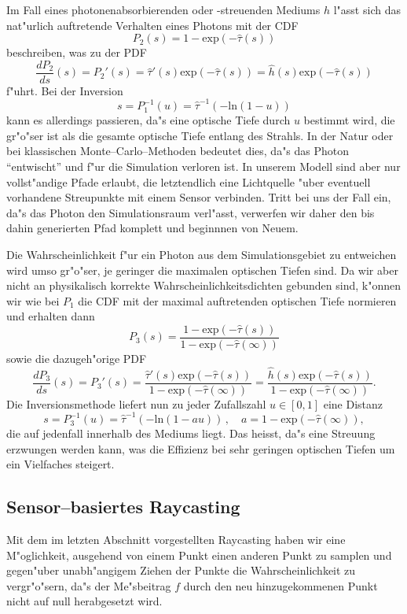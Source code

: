 	Im Fall eines photonenabsorbierenden oder -streuenden Mediums $h$ l"asst sich das nat"urlich auftretende Verhalten eines Photons mit der CDF
	$$P_2(s)=1-\text{exp}(-{\hat \tau}(s))$$
	beschreiben, was zu der PDF
	$$\frac{dP_2}{ds}(s)=P_2'(s)={\hat \tau}'(s)\text{exp}(-{\hat \tau}(s))={\hat h}(s)\text{exp}(-{\hat \tau}(s))$$
	f"uhrt. Bei der Inversion
	$$s=P_1^{-1}(u)={\hat \tau}^{-1}\left(-\text{ln}(1-u)\right)$$
	kann es allerdings passieren, da"s eine optische Tiefe durch $u$ bestimmt wird, die gr"o"ser ist als die gesamte optische Tiefe entlang des Strahls. In der Natur oder bei klassischen Monte--Carlo--Methoden bedeutet dies, da"s das Photon ``entwischt'' und f"ur die Simulation verloren ist. In unserem Modell sind aber nur vollst"andige Pfade erlaubt, die letztendlich eine Lichtquelle "uber eventuell vorhandene Streupunkte mit einem Sensor verbinden. Tritt bei uns der Fall ein, da"s das Photon den Simulationsraum verl"asst, verwerfen wir daher den bis dahin generierten Pfad komplett und beginnnen von Neuem.
	
	Die Wahrscheinlichkeit f"ur ein Photon aus dem Simulationsgebiet zu entweichen wird umso gr"o"ser, je geringer die maximalen optischen Tiefen sind. Da wir aber nicht an physikalisch korrekte Wahrscheinlichkeitsdichten gebunden sind, k"onnen wir wie bei $P_1$ die CDF mit der maximal auftretenden optischen Tiefe normieren und erhalten dann
	$$P_3(s)=\frac{1-\text{exp}(-{\hat \tau}(s))}{1-\text{exp}(-{\hat \tau}(\infty))}$$
	sowie die dazugeh"orige PDF
	$$\frac{dP_3}{ds}(s)=P_3'(s)=\frac{{\hat \tau}'(s)\text{exp}(-{\hat \tau}(s))}{1-\text{exp}(-{\hat \tau}(\infty))}=\frac{{\hat h}(s)\text{exp}(-{\hat \tau}(s))}{1-\text{exp}(-{\hat \tau}(\infty))}.$$
	Die Inversionsmethode liefert nun zu jeder Zufallszahl $u\in[0,1]$ eine Distanz
	$$s=P_3^{-1}(u)={\hat \tau}^{-1}\left(-\text{ln}(1-a u)\right)\,,\quad a=1-\text{exp}(-{\hat \tau}(\infty)),$$
	die auf jedenfall innerhalb des Mediums liegt. Das heisst, da"s eine Streuung erzwungen werden kann, was die Effizienz bei sehr geringen optischen Tiefen um ein Vielfaches steigert.
	
	\subsection{Sensor--basiertes Raycasting}
	Mit dem im letzten Abschnitt vorgestellten Raycasting haben wir eine M"oglichkeit, ausgehend von einem Punkt einen anderen Punkt zu samplen und gegen"uber unabh"angigem Ziehen der Punkte die Wahrscheinlichkeit zu vergr"o"sern, da"s der Me"sbeitrag $f$ durch den neu hinzugekommenen Punkt nicht auf null herabgesetzt wird.
	

